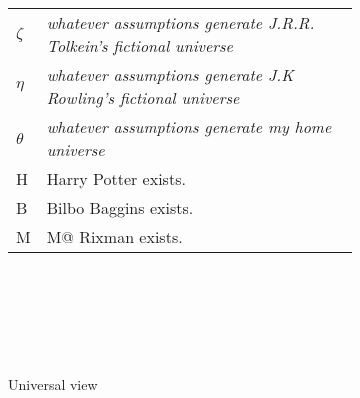 \documentclass[12pt]{article}
\begin{document}
\begin{flushleft}
\begin{figure}[h]
    \centering
    \begin{subfigure}{\linewidth}
        \centering
        \begin{tabular}{l|l}
            \hline
            $\zeta$ & \textit{whatever assumptions generate J.R.R. Tolkein's fictional universe}\\
            $\eta$ & \textit{whatever assumptions generate J.K Rowling's fictional universe}\\
            $\theta$ & \textit{whatever assumptions generate my home universe}\\
            H & Harry Potter exists.\\
            B & Bilbo Baggins exists.\\
            M & M@ Rixman exists.\\
            \hline
        \end{tabular}
    \end{subfigure}\\
    \par\bigskip
    \begin{subfigure}{.25\linewidth}
        \centering
        \fitchctx
        {
            \pline{\bigstar} \\
            \subproof
            {
                \pline{\mathnormal{\theta}}
            }
            {
                 \\
                \subproof
                {
                    \pline{\mathnormal{\eta}}
                }
                {
                }
            } \\
            \subproof
            {
                \pline{\mathnormal{\beta}}
            }
            {
            }
        }
        \caption{Universal view}
        \label{universe}
    \end{subfigure}%
    \begin{subfigure}{.25\linewidth}
        \centering
            \hspace*{3em}%
            \fitchprf
            {
                \pline{\mathnormal{\theta}}
            }
            {
                \pline{\bigstar} \\
                \subproof
                {
                    \pline{\mathnormal{\eta}}
                }
                {
                } \\
                \subproof
                {
}}
\end{subfigure}
\end{figure}
\end{flushleft}
\end{document}
